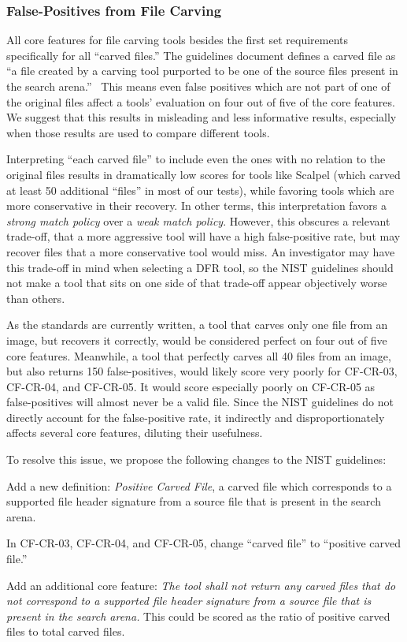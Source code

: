 \subsubsection{False-Positives from File Carving} \label{sec:false_pos}

All core features for file carving tools besides the first set requirements specifically for all ``carved files.''
The guidelines document defines a carved file as ``a file created by a carving tool purported to be one of the source files present in the search arena.''~\cite{carving_standards}
This means even false positives which are not part of one of the original files affect a tools' evaluation on four out of five of the core features.
We suggest that this results in misleading and less informative results, especially when those results are used to compare different tools.
 
Interpreting ``each carved file'' to include even the ones with no relation to the original files results in dramatically low scores for tools like Scalpel (which carved at least 50 additional ``files'' in most of our tests), while favoring tools which are more conservative in their recovery.
In other terms, this interpretation favors a \emph{strong match policy} over a \emph{weak match policy}.
However, this obscures a relevant trade-off, that a more aggressive tool will have a high false-positive rate, but may recover files that a more conservative tool would miss.
An investigator may have this trade-off in mind when selecting a DFR tool, so the NIST guidelines should not make a tool that sits on one side of that trade-off appear objectively worse than others.

As the standards are currently written, a tool that carves only one file from an image, but recovers it correctly, would be considered perfect on four out of five core features.
Meanwhile, a tool that perfectly carves all 40 files from an image, but also returns 150 false-positives, would likely score very poorly for CF-CR-03, CF-CR-04, and CF-CR-05.
It would score especially poorly on CF-CR-05 as false-positives will almost never be a valid file.
Since the NIST guidelines do not directly account for the false-positive rate, it indirectly and disproportionately affects several core features, diluting their usefulness.

To resolve this issue, we propose the following changes to the NIST guidelines:
\begin{arabiclist}
 \item Add a new definition: \emph{Positive Carved File}, a carved file which corresponds to a supported file header signature from a source file that is present in the search arena.
 \item In CF-CR-03, CF-CR-04, and CF-CR-05, change ``carved file'' to ``positive carved file.''
 \item Add an additional core feature: \emph{The tool shall not return any carved files that do not correspond to a supported file header signature from a source file that is present in the search arena.} This could be scored as the ratio of positive carved files to total carved files.
\end{arabiclist}


